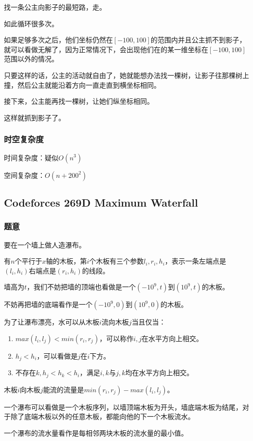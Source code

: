 \documentclass{ctexart}
\begin{document}
找一条公主向影子的最短路，走。

如此循环很多次。

如果足够多次之后，他们坐标仍然在$[-100,100]$的范围内并且公主抓不到影子，就可以看做无解了，因为正常情况下，会出现他们在的某一维坐标在$[-100,100]$范围以外的情况。

只要这样的话，公主的活动就自由了，她就能想办法找一棵树，让影子往那棵树上撞，然后公主就能沿着方向一直走直到横坐标相同。

接下来，公主能再找一棵树，让她们纵坐标相同。

这样就抓到影子了。
\subsubsection{时空复杂度}
时间复杂度：疑似$O(n^3)$

空间复杂度：$O(n+200^2)$
\subsection{Codeforces 269D Maximum Waterfall}
\subsubsection{题意}
要在一个墙上做人造瀑布。

有$n$个平行于$x$轴的木板，第$i$个木板有三个参数$l_i,r_i,h_i$，表示一条左端点是$(l_i,h_i)$右端点是$(r_i,h_i)$的线段。

墙高为$t$，我们不妨把墙的顶端也看做是一个$(-10^9,t)$到$(10^9,t)$的木板。

不妨再把墙的底端看作是一个$(-10^9,0)$到$(10^9,0)$的木板。

为了让瀑布漂亮，水可以从木板$i$流向木板$j$当且仅当：

\begin{enumerate}
\item $max(l_i,l_j)<min(r_i,r_j)$，可以称作$i,j$在水平方向上相交。
\item $h_j<h_i$，可以看做是$j$在$i$下方。
\item 不存在$k,h_j<h_k<h_i$，满足$i,k$与$j,k$均在水平方向上相交。
\end{enumerate}

木板$i$向木板$j$能流的流量是$min(r_i,r_j)-max(l_i,l_j)$。

一个瀑布可以看做是一个木板序列，以墙顶端木板为开头，墙底端木板为结尾，对于除了底端木板以外的任意木板，都能向他的下一个木板流水。

一个瀑布的流水量看作是每相邻两块木板的流水量的最小值。
\end{document}
